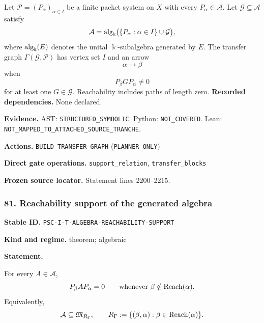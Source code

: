 \documentclass[a4paper,11pt]{article}
\newcommand{\bbk}{\Bbbk}\newcommand{\A}{\mathcal A}\newcommand{\B}{\mathcal B}\newcommand{\Ccal}{\mathcal C}\newcommand{\Pcal}{\mathcal P}\newcommand{\Qcal}{\mathcal Q}\newcommand{\Rcal}{\mathcal R}\newcommand{\Scal}{\mathcal S}
\newcommand{\field}[2]{\noindent\textbf{#1.} #2\par}
\begin{document}
Let $\Pcal=(P_\alpha)_{\alpha\in I}$ be a finite packet system on $X$ with every $P_\alpha\in\A$.  Let $\mathcal G\subseteq\A$ satisfy
\[
\A=\alg_{\bbk}\bigl(\{P_\alpha:\alpha\in I\}\cup\mathcal G\bigr),
\]
where $\alg_{\bbk}(E)$ denotes the unital $\bbk$-subalgebra generated by $E$.  The transfer graph $\Gamma(\mathcal G,\Pcal)$ has vertex set $I$ and an arrow
\[
\alpha\longrightarrow\beta
\]
when
\[
P_\beta GP_\alpha\neq0
\]
for at least one $G\in\mathcal G$.  Reachability includes paths of length zero.
\field{Recorded dependencies}{None declared.}
\field{Evidence}{AST: \nolinkurl{STRUCTURED_SYMBOLIC}. Python: \nolinkurl{NOT_COVERED}. Lean: \nolinkurl{NOT_MAPPED_TO_ATTACHED_SOURCE_TRANCHE}.}
\field{Actions}{\nolinkurl{BUILD_TRANSFER_GRAPH} (\nolinkurl{PLANNER_ONLY})}
\field{Direct gate operations}{\nolinkurl{support_relation}, \nolinkurl{transfer_blocks}}
\field{Frozen source locator}{Statement lines 2200--2215.}
\subsubsection*{81. Reachability support of the generated algebra}
\label{rec:PSC-I-T-ALGEBRA-REACHABILITY-SUPPORT}
\field{Stable ID}{\nolinkurl{PSC-I-T-ALGEBRA-REACHABILITY-SUPPORT}}
\field{Kind and regime}{theorem; algebraic}
\textbf{Statement.}\par
For every $A\in\A$,
\[
P_\beta AP_\alpha=0
\qquad\text{whenever }\beta\notin\operatorname{Reach}(\alpha).
\]
Equivalently,
\[
\A\subseteq\mathfrak M_{R_\Gamma},
\qquad
R_\Gamma:=\{(\beta,\alpha):\beta\in\Reach(\alpha)\}.
\]
\end{document}
